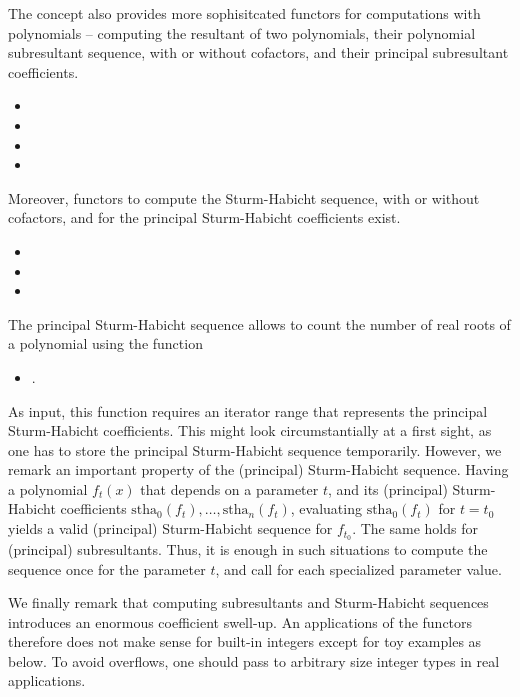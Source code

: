 The  concept also provides more sophisitcated functors
for computations with polynomials --
computing the resultant of two polynomials, 
their polynomial subresultant sequence, with or without cofactors,
and their principal subresultant coefficients.
%
\begin{itemize}
\item {}\ccGlue
\item {}\ccGlue
\item {}\ccGlue
\item {}
\end{itemize}
%
Moreover, functors to compute the Sturm-Habicht sequence, with or without
cofactors, and for the principal Sturm-Habicht coefficients exist.
%
\begin{itemize}
\item {}\ccGlue
\item {}\ccGlue
\item {}
\end{itemize}
%
The principal Sturm-Habicht sequence allows to count the number of
real roots of a polynomial using the function
\begin{itemize}
\item {}.
\end{itemize}
As input, this function requires an iterator range that represents
the principal Sturm-Habicht coefficients. 
This might look circumstantially at a first sight,
as one has to store the principal Sturm-Habicht sequence temporarily.
However, we remark an important property of the (principal) Sturm-Habicht
sequence. Having a polynomial $f_t(x)$ that depends on a parameter $t$,
and its (principal) Sturm-Habicht coefficients 
$\mathrm{stha}_0(f_t),\ldots,\mathrm{stha}_n(f_t)$, evaluating 
$\mathrm{stha}_0(f_t)$ for $t=t_0$ yields a valid (principal)
Sturm-Habicht sequence for $f_{t_0}$. The same holds for (principal)
subresultants. Thus, it is enough in such situations to compute
the sequence once for the parameter $t$, and call 
 for each specialized parameter
value.

We finally remark that computing subresultants and Sturm-Habicht sequences
introduces an enormous coefficient swell-up.
An applications of the functors therefore does not make sense
for built-in integers except for toy examples as below.
To avoid overflows, one should pass to arbitrary size integer types
in real applications.

